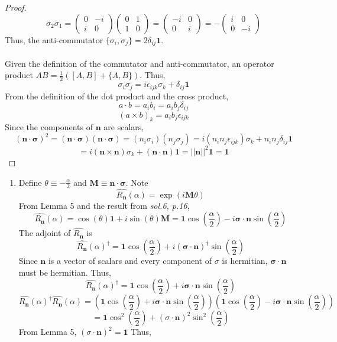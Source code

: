 \begin{sol}
\begin{proof}
$$\sigma_2\sigma_1=\begin{pmatrix}0&-i\\i&0\end{pmatrix}\begin{pmatrix}0&1\\1&0\end{pmatrix}=\begin{pmatrix}-i&0\\0&i\end{pmatrix}=-\begin{pmatrix}i&0\\0&-i\end{pmatrix}$$ 
Thus, the anti-commutator $\{\sigma_i,\sigma_j\}=2\delta_{ij}\mathbf{1}$.\\\\
Given the definition of the commutator and anti-commutator, an operator product $AB=\frac{1}{2}([A,B]+\{A,B\})$. Thus,
$$\sigma_i\sigma_j=i\epsilon_{ijk}\sigma_k+\delta_{ij}\mathbf{1}$$
From the definition of the dot product and the cross product, $$a\cdot b=a_ib_i=a_ib_j\delta_{ij}$$ 
$$(a\times b)_k=a_ib_j\epsilon_{ijk}$$
Since the components of $\mathbf{n}$ are scalars, 
$$(\mathbf{n}\cdot\mathbf{\sigma})^2=(\mathbf{n}\cdot\mathbf{\sigma})(\mathbf{n}\cdot\mathbf{\sigma})=(n_i\sigma_i)(n_j\sigma_j)=i(n_in_j\epsilon_{ijk})\sigma_k+n_in_j\delta_{ij}\mathbf{1}$$ 
$$=i(\mathbf{n}\times\mathbf{n})\sigma_k+(\mathbf{n}\cdot\mathbf{n})\mathbf{1}=||\mathbf{n}||^2\mathbf{1}=\mathbf{1}$$
\end{proof}
\begin{enumerate}[label=\textbf{(\alph*)}]
\item
Define $\theta\equiv-\frac{\alpha}{2}$ and $\mathbf{M}\equiv\mathbf{n}\cdot\mathbf{\sigma} $. Note $$\hat{R_\mathbf{n}}(\alpha) = \exp(i\mathbf{M}\theta)$$
From Lemma 5 and the result from \textit{sol.6, p.16},
$$\hat{R_\mathbf{n}}(\alpha) =\cos(\theta)\mathbf{1}+i\sin(\theta)\mathbf{M}=\mathbf{1}\cos(\frac{\alpha}{2})-i\mathbf{\sigma}\cdot\mathbf{n}\sin(\frac{\alpha}{2})$$ The adjoint of $\hat{R_\mathbf{n}}$ is 
$$\hat{R_\mathbf{n}}(\alpha)^\dagger=\mathbf{1}\cos(\frac{\alpha}{2})+i(\mathbf{\sigma}\cdot\mathbf{n})^\dagger\sin(\frac{\alpha}{2})$$
Since $\mathbf{n}$ is a vector of scalars and every component of $\sigma$ is hermitian, $\mathbf{\sigma}\cdot\mathbf{n}$ must be hermitian. Thus, 
$$\hat{R_\mathbf{n}}(\alpha)^\dagger=\mathbf{1}\cos(\frac{\alpha}{2})+i\mathbf{\sigma}\cdot\mathbf{n}\sin(\frac{\alpha}{2})$$
$$\hat{R_\mathbf{n}}(\alpha)^\dagger\hat{R_\mathbf{n}}(\alpha)=(\mathbf{1}\cos(\frac{\alpha}{2})+i\mathbf{\sigma}\cdot\mathbf{n}\sin(\frac{\alpha}{2}))(\mathbf{1}\cos(\frac{\alpha}{2})-i\mathbf{\sigma}\cdot\mathbf{n}\sin(\frac{\alpha}{2}))$$ $$=\mathbf{1}\cos^2(\frac{\alpha}{2})+(\sigma\cdot\mathbf{n})^2\sin^2(\frac{\alpha}{2})$$ From Lemma 5, $(\sigma\cdot\mathbf{n})^2=\mathbf{1}$ Thus,

\end{enumerate}
\end{sol}
